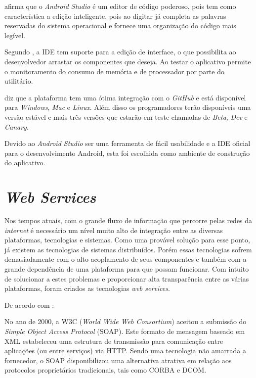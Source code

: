 	\par {} afirma que o \textit{Android Studio} é um editor
de código poderoso, pois tem como característica a edição inteligente, pois ao
digitar já completa as palavras reservadas do sistema operacional e fornece uma
organização do código mais legível.

	\par Segundo , a IDE tem suporte para a edição de
interface, o que possibilita ao desenvolvedor arrastar os componentes que
deseja. Ao testar o aplicativo permite o monitoramento do consumo de memória e
de processador por parte do utilitário.

	\par {} diz que a plataforma tem uma ótima integração com
o \textit{GitHub} e está disponível para \textit{Windows}, \textit{Mac} e
\textit{Linux}. Além disso os programadores terão disponíveis uma versão
estável e mais três versões que estarão em teste chamadas de \textit{Beta},
\textit{Dev} e \textit{Canary}.

	\par Devido ao \textit{Android Studio} ser uma ferramenta de fácil usabilidade
e a IDE oficial para o desenvolvimento Android, esta foi escolhida como ambiente de
construção do aplicativo.	
	
\section{\textit{Web Services}}
	
	\par Nos tempos atuais, com o grande fluxo de informação que percorre pelas
redes da \textit{internet} é necessário um nível muito alto de integração entre
as diversas plataformas, tecnologias e sistemas. Como uma provável solução para
esse ponto, já existem as tecnologias de sistemas distribuídos. Porém essas
tecnologias sofrem demasiadamente com o alto acoplamento de seus componentes e
também com a grande dependência de uma plataforma para que possam funcionar. Com
intuito de solucionar a estes problemas e proporcionar alta transparência entre
as várias plataformas, foram criados as tecnologias \textit{web services}.
	
	
	\par De acordo com :
	\begin{citacao}
		No ano de 2000, a W3C (\textit{World Wide Web Consortium}) aceitou a submissão
		do \textit{Simple Object Access Protocol} (SOAP). Este formato de mensagem
		baseado em XML estabeleceu uma estrutura de transmissão para comunicação entre
		aplicações (ou entre serviços) via HTTP. Sendo uma tecnologia não amarrada a
		fornecedor, o SOAP disponibilizou uma alternativa atrativa em relação aos
		protocolos proprietários tradicionais, tais como CORBA e DCOM.
	\end{citacao}
	
